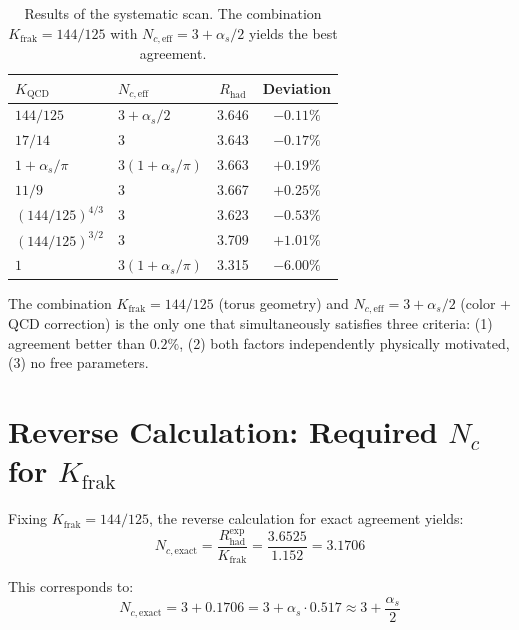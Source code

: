 	\begin{table}[h]
		\centering
		\begin{tabular}{llcc}
			\toprule
			\textbf{$K_\text{QCD}$} & \textbf{$N_{c,\text{eff}}$} & \textbf{$R_\text{had}$} & \textbf{Deviation} \\
			\midrule
			$144/125$ & $3 + \alpha_s/2$ & 3.646 & $\mathbf{-0.11\%}$ \\
			$17/14$ & 3 & 3.643 & $-0.17\%$ \\
			$1 + \alpha_s/\pi$ & $3(1 + \alpha_s/\pi)$ & 3.663 & $+0.19\%$ \\
			$11/9$ & 3 & 3.667 & $+0.25\%$ \\
			$(144/125)^{4/3}$ & 3 & 3.623 & $-0.53\%$ \\
			$(144/125)^{3/2}$ & 3 & 3.709 & $+1.01\%$ \\
			$1$ & $3(1 + \alpha_s/\pi)$ & 3.315 & $-6.00\%$ \\
			\bottomrule
		\end{tabular}
		\caption{Results of the systematic scan. The combination $K_\text{frak} = 144/125$ with $N_{c,\text{eff}} = 3 + \alpha_s/2$ yields the best agreement.}
		\label{tab:scan}
	\end{table}
	
	\begin{keypoint}
		The combination $K_\text{frak} = 144/125$ (torus geometry) and $N_{c,\text{eff}} = 3 + \alpha_s/2$ (color + QCD correction) is the only one that simultaneously satisfies three criteria: (1) agreement better than $0.2\%$, (2) both factors independently physically motivated, (3) no free parameters.
	\end{keypoint}
	
	
	\section{Reverse Calculation: Required $N_c$ for $K_\text{frak}$}
	
	Fixing $K_\text{frak} = 144/125$, the reverse calculation for exact agreement yields:
	\begin{equation}
		N_{c,\text{exact}} = \frac{R_\text{had}^\text{exp}}{K_\text{frak}} = \frac{3.6525}{1.152} = 3.1706
	\end{equation}
	
	This corresponds to:
	\begin{equation}
		N_{c,\text{exact}} = 3 + 0.1706 = 3 + \alpha_s \cdot 0.517 \approx 3 + \frac{\alpha_s}{2}
	\end{equation}
	
